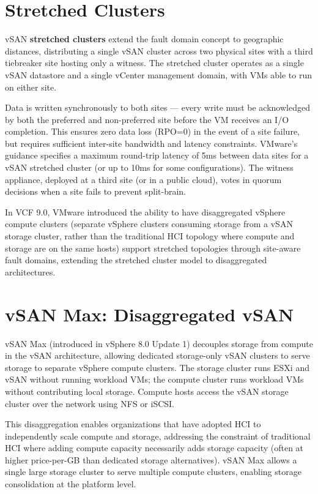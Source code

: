 \section{Stretched Clusters}
vSAN \textbf{stretched clusters} extend the fault domain concept to geographic distances, distributing a single vSAN cluster across two physical sites with a third tiebreaker site hosting only a witness. The stretched cluster operates as a single vSAN datastore and a single vCenter management domain, with VMs able to run on either site.

Data is written synchronously to both sites --- every write must be acknowledged by both the preferred and non-preferred site before the VM receives an I/O completion. This ensures zero data loss (RPO=0) in the event of a site failure, but requires sufficient inter-site bandwidth and latency constraints. VMware's guidance specifies a maximum round-trip latency of 5ms between data sites for a vSAN stretched cluster (or up to 10ms for some configurations). The witness appliance, deployed at a third site (or in a public cloud), votes in quorum decisions when a site fails to prevent split-brain.

In VCF 9.0, VMware introduced the ability to have disaggregated vSphere compute clusters (separate vSphere clusters consuming storage from a vSAN storage cluster, rather than the traditional HCI topology where compute and storage are on the same hosts) support stretched topologies through site-aware fault domains, extending the stretched cluster model to disaggregated architectures.

\section{vSAN Max: Disaggregated vSAN}
vSAN Max (introduced in vSphere 8.0 Update 1) decouples storage from compute in the vSAN architecture, allowing dedicated storage-only vSAN clusters to serve storage to separate vSphere compute clusters. The storage cluster runs ESXi and vSAN without running workload VMs; the compute cluster runs workload VMs without contributing local storage. Compute hosts access the vSAN storage cluster over the network using NFS or iSCSI.

This disaggregation enables organizations that have adopted HCI to independently scale compute and storage, addressing the constraint of traditional HCI where adding compute capacity necessarily adds storage capacity (often at higher price-per-GB than dedicated storage alternatives). vSAN Max allows a single large storage cluster to serve multiple compute clusters, enabling storage consolidation at the platform level.

